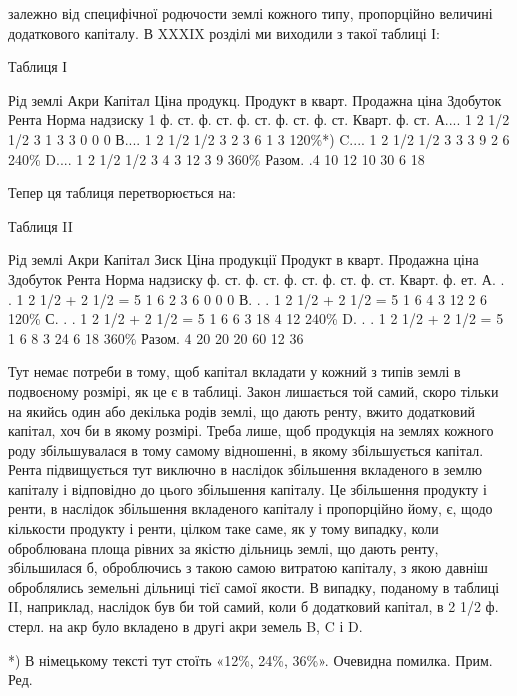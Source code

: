 залежно від специфічної родючости землі кожного типу, пропорційно величині
додаткового капіталу. В XXXIX розділі ми виходили з такої таблиці І:

Таблиця І

Рід землі    Акри Капітал    Ціна продукц. Продукт в кварт.
Продажна  ціна    Здобуток    Рента    Норма  надзиску
        1 ф. ст. ф. ст. ф. ст. ф. ст. ф. ст. Кварт. ф. ст.
А....    1    2 1/2    1/2    3    1    3    3    0    0    0
В....    1    2 1/2    1/2    3    2    3    6    1    3    120\%*)
C....    1    2 1/2    1/2    3    3    3    9    2    6    240\%
D....    1    2 1/2    1/2    3    4    3    12    3    9    360\%
Разом. .4    10               12    10        30    6    18

Тепер ця таблиця перетворюється на:

Таблиця II

Рід  землі    Акри  Капітал    Зиск    Ціна продукції Продукт в кварт.
Продажна  ціна    Здобуток    Рента    Норма  надзиску
        ф. ст. ф. ст. ф. ст. ф. ст. ф. ст. Кварт. ф. ет.
А. . .    1    2 1/2 + 2 1/2 = 5    1    6    2    3    6    0    0    0
В. . .    1    2 1/2 + 2 1/2 = 5    1    6    4    3    12    2    6    120\%
С. . .    1    2 1/2 + 2 1/2 = 5    1    6    6    3    18    4    12    240\%
D. . .    1    2 1/2 + 2 1/2 = 5    1    6    8    3    24    6    18    360\%
Разом.    4          20            20        20            60    12    36

Тут немає потреби в тому, щоб капітал вкладати у кожний з типів землі
в подвоєному розмірі, як це є в таблиці. Закон лишається той самий, скоро
тільки на якийсь один або декілька родів землі, що дають ренту, вжито додатковий капітал, хоч би в
якому розмірі. Треба лише, щоб продукція на землях
кожного роду збільшувалася в тому самому відношенні, в якому збільшується
капітал. Рента підвищується тут виключно в наслідок збільшення вкладеного
в землю капіталу і відповідно до цього збільшення капіталу. Це збільшення
продукту і ренти, в наслідок збільшення вкладеного капіталу і пропорційно
йому, є,  щодо кількости продукту і ренти, цілком таке саме, як у тому випадку,
коли оброблювана площа рівних за якістю дільниць землі, що дають ренту,
збільшилася б, оброблючись з такою самою витратою капіталу, з якою давніш оброблялись земельні
дільниці тієї самої якости. В випадку, поданому в таблиці II, наприклад, наслідок був би той самий,
коли б додатковий капітал,
в 2 1/2 ф. стерл. на акр було вкладено в другі акри земель B, C і D.

*) В німецькому тексті тут стоїть «12\%, 24\%, 36\%». Очевидна помилка. Прим. Ред.

